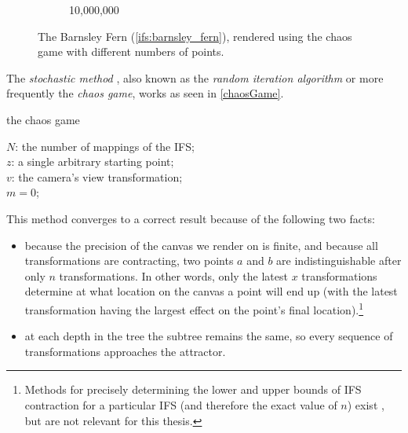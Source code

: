 \documentclass[11pt]{article}
\begin{document}
\begin{figure}
\begin{subfigure}[b]{0.4\textwidth}
         \caption{10,000,000}
         \label{figure:barnsley_ten_mil}
     \end{subfigure}
        \caption{The Barnsley Fern (\autoref{ifs:barnsley_fern}), rendered using the chaos game with different numbers of points.}
        \label{figure:barnsley_chaos_game_points}
\end{figure}


The \emph{stochastic method} \cite{hepting1991rendering}, also known as the \emph{random iteration algorithm} \cite{barnsley1988fractals} or more frequently the \emph{chaos game}, works as seen in \autoref{chaosGame}.

\begin{algorithm}
\caption{the chaos game}
\label{chaosGame}
  $N$: the number of mappings of the IFS; \\
  $z$: a single arbitrary starting point; \\
  $v$: the camera's view transformation; \\
  $m = 0$; \\
  \For{$m \in [0..n + P)$}{ 
    $i$: a random integer between $0$ and $N$;  \\
    \If{$m \geq n$}{
      render($v(z)$) cumulatively; \\
    }
    $z = f_i(z)$; \\
  }

\end{algorithm}

This method converges to a correct result because of the following two facts:

\begin{itemize}
\item because the precision of the canvas we render on is finite, and because all transformations are contracting,
two points \(a\) and \(b\) are indistinguishable after only \(n\) transformations.
 In other words, only the latest \(x\) transformations determine at what location on the canvas a point will end up (with the latest transformation having the largest effect on the point's final location).\footnote{Methods for precisely determining the lower and upper bounds of IFS contraction for a particular IFS (and therefore the exact value of \(n\)) exist \cite{hepting1991rendering}, 
but are not relevant for this thesis.}
\item at each depth in the tree the subtree remains the same, so every sequence of transformations approaches the attractor.
\end{itemize}
\end{document}
